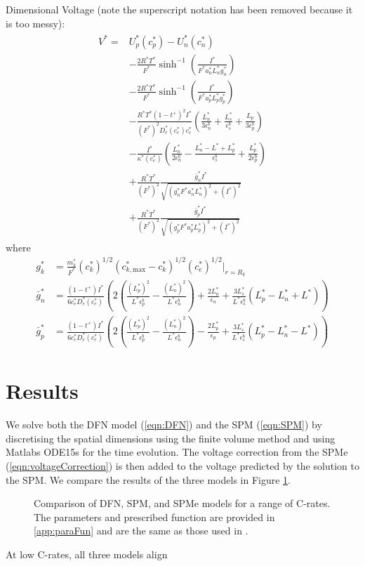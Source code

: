 \documentclass[preprint]{elsarticle}
\begin{document}
Dimensional Voltage (note the superscript notation has been removed because it is too messy): 
\begin{align} 
	\begin{split} 
V^* = &U_p^*(c_p^{*}) - U_n^*(c_n^{*}) 
\\ &- \frac{2R^*T^*}{F^*}\sinh^{-1}\left(\frac{I^*}{F^*a_n^*L_n^* g_n^{*}}\right) \\
&- \frac{2R^*T^*}{F^*}\sinh^{-1}\left(\frac{I^*}{F^*a_p^*L_p^* g_p^{*}}\right) \\ 
&-\frac{R^* T^* (1-t^+)^2 I^*}{(F^*)^2 D_e^*(c_e^{*}) c_e^{*}}\left(\frac{L_n^*}{3\epsilon_n^b} + \frac{L_s^*}{\epsilon_s^b} + \frac{L_p}{3\epsilon_p^b} \right) \\ 
&-\frac{I^*}{\kappa^*(c_e^{*})}\left(\frac{L_n^*}{2\epsilon_n^b} - \frac{L_n^* - L^* + L_p^*}{\epsilon_s^b} + \frac{L_p^*}{2\epsilon_p^b} \right) \\ 
&+\frac{R^* T^*}{(F^*)^2}\frac{\bar{g}_n^* I^*}{\sqrt{(g_n^* F^* a_n^* L_n^*)^2+ (I^*)^2}} \\ 
&+\frac{R^* T^*}{(F^*)^2}\frac{\bar{g}_p^* I^*}{\sqrt{(g_p^* F^* a_p^* L_p^*)^2+ (I^*)^2}}
\end{split}
\end{align} 
where 
\begin{align} 
	g_k^* &= \frac{m_k^*}{F^*} (c_k^*)^{1/2} (c^*_{k,\text{max}}-c_k^*)^{1/2}(c_e^*)^{1/2}\bigg|_{r=R_k} \\
    \bar{g}_n^* &= \frac{(1-t^+)I^*}{6 c_e^* D_e^*(c_e^*)}\left( 2\left(\frac{(L_p^*)^2}{L^*\epsilon_p^b} - \frac{(L_n^*)^2}{L^*\epsilon_n^b} \right) + \frac{2 L_n^*}{\epsilon_n} + \frac{3L^*_{s}}{L^*\epsilon_{s}^{b}}(L_p^*-L_n^*+L^*)\right) \\
    \bar{g}_p^* &= \frac{(1-t^+)I^*}{6 c_e^* D_e^*(c_e^*)}\left( 2\left(\frac{(L_p^*)^2}{L^*\epsilon_p^b} - \frac{(L_n^*)^2}{L^*\epsilon_n^b} \right) - \frac{2 L_p^*}{\epsilon_p} + \frac{3L^*_{s}}{L^*\epsilon_{s}^{b}}(L^*_p-L^*_n-L^*)\right)
\end{align}

\section{Results}
We solve both the DFN model (\ref{eqn:DFN}) and the SPM (\ref{eqn:SPM}) by discretising the spatial dimensions using the finite volume method and using Matlabs ODE15s for the time evolution. The voltage correction from the SPMe (\ref{eqn:voltageCorrection}) is then added to the voltage predicted by the solution to the SPM. We compare the results of the three models in Figure \ref{fig:voltageCompare}.
\begin{figure}[h!]
	\voltage %
    \caption{Comparison of DFN, SPM, and SPMe models for a range of C-rates. The parameters and prescribed function are provided in \ref{app:paraFun} and are the same as those used in \cite{Moura2017}.}\label{fig:voltageCompare}
\end{figure} 
At low C-rates, all three models align
\end{document}
